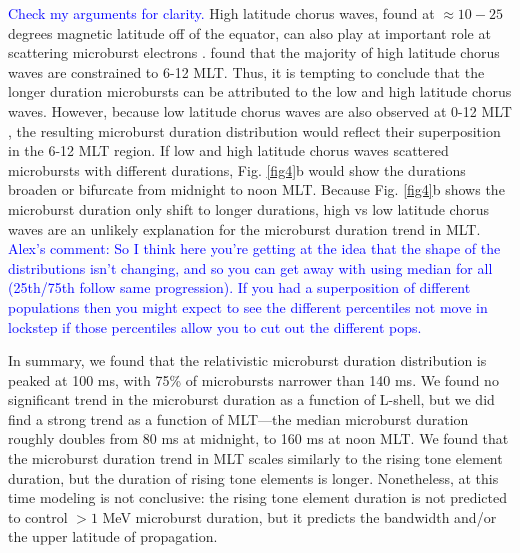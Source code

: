 \documentclass[draft]{agujournal2019}
\begin{document}
\textcolor{blue}{Check my arguments for clarity.} High latitude chorus waves, found at $\approx 10-25$ degrees magnetic latitude off of the equator, can also play at important role at scattering microburst electrons \cite{Lorentzen2001a}.  found that the majority of high latitude chorus waves are constrained to 6-12 MLT. Thus, it is tempting to conclude that the longer duration microbursts can be attributed to the low and high latitude chorus waves. However, because low latitude chorus waves are also observed at 0-12 MLT \cite{Li2009a}, the resulting microburst duration distribution would reflect their superposition in the 6-12 MLT region. If low and high latitude chorus waves scattered microbursts with different durations, Fig. \ref{fig4}b would show the durations broaden or bifurcate from midnight to noon MLT. Because Fig. \ref{fig4}b shows the microburst duration only shift to longer durations, high vs low latitude chorus waves are an unlikely explanation for the microburst duration trend in MLT. \textcolor{blue}{Alex's comment:  So I think here you’re getting at the idea that the shape of the distributions isn’t changing, and so you can get away with using median for all (25th/75th follow same progression). If you had a superposition of different populations then you might expect to see the different percentiles not move in lockstep if those percentiles allow you to cut out the different pops.}

In summary, we found that the relativistic microburst duration distribution is peaked at 100 ms, with 75\% of microbursts narrower than 140 ms. We found no significant trend in the microburst duration as a function of L-shell, but we did find a strong trend as a function of MLT---the median microburst duration roughly doubles from 80 ms at midnight, to 160 ms at noon MLT. We found that the microburst duration trend in MLT scales similarly to the rising tone element duration, but the duration of rising tone elements is longer. Nonetheless, at this time modeling is not conclusive: the rising tone element duration is not predicted to control $>1$ MeV microburst duration, but it predicts the bandwidth and/or the upper latitude of propagation.

%
%
%
%
\end{document}
